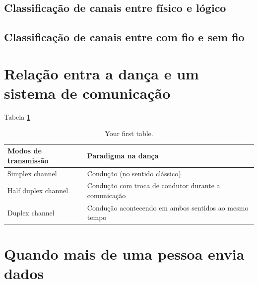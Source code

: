 \documentclass[a4paper,10pt]{article}
\begin{document}
\subsection{Classificação de canais entre físico e lógico}
\subsection{Classificação de canais entre com fio e sem fio}

\section{Relação entra a dança e um sistema de comunicação}
Tabela \ref{tab:table1}
\begin{table}[h!]
  \begin{center}
    \caption{Your first table.}
    \label{tab:table1}
    \begin{tabular}{|l|p{6cm}|} %
    \hline
      Modos de transmissão & Paradigma na dança \\ \hline \hline
      Simplex channel & Condução (no sentido clássico)  \\ \hline
      Half duplex channel & Condução com troca de condutor durante a comunicação\\ \hline
      Duplex channel & Condução acontecendo em ambos sentidos ao mesmo tempo \\ \hline
    \end{tabular}
  \end{center}
\end{table}

\section{Quando mais de uma pessoa envia dados}
\end{document}
